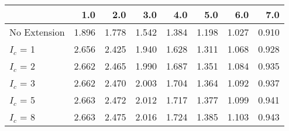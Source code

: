 \begin{tabular}{lrrrrrrr}
\toprule
{} &   1.0 &   2.0 &   3.0 &   4.0 &   5.0 &   6.0 &   7.0 \\
\midrule
No Extension & 1.896 & 1.778 & 1.542 & 1.384 & 1.198 & 1.027 & 0.910 \\
$I_c$ = 1    & 2.656 & 2.425 & 1.940 & 1.628 & 1.311 & 1.068 & 0.928 \\
$I_c$ = 2    & 2.662 & 2.465 & 1.990 & 1.687 & 1.351 & 1.084 & 0.935 \\
$I_c$ = 3    & 2.662 & 2.470 & 2.003 & 1.704 & 1.364 & 1.092 & 0.937 \\
$I_c$ = 5    & 2.663 & 2.472 & 2.012 & 1.717 & 1.377 & 1.099 & 0.941 \\
$I_c$ = 8    & 2.663 & 2.475 & 2.016 & 1.724 & 1.385 & 1.103 & 0.943 \\
\bottomrule
\end{tabular}
